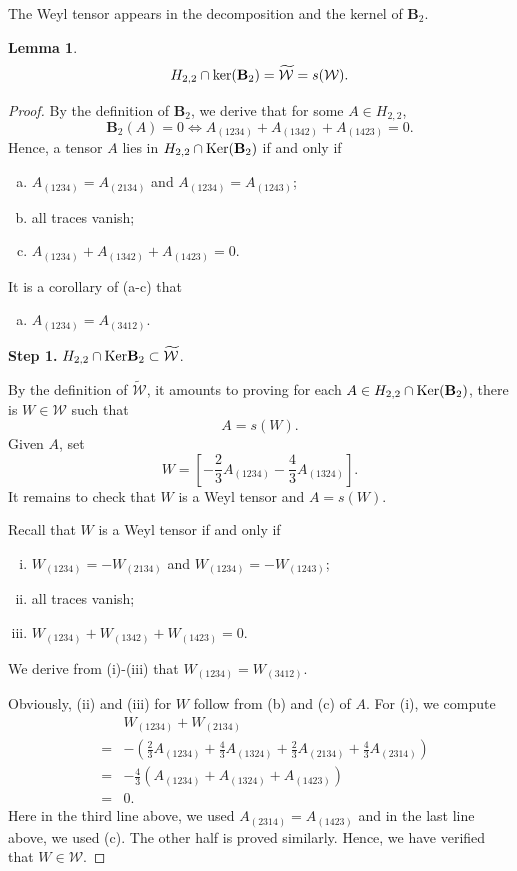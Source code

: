 \documentclass{amsart}
\newtheorem{lem}[thm]{Lemma}
\numberwithin{equation}{section}
\begin{document}
The Weyl tensor appears in the decomposition and the kernel of ${\mathbf B}_2$.
\begin{lem}
	\label{lem:weyl} 
	\[
		H_{2,2}\cap {\rm ker}({\mathbf B}_2) = \widetilde{\mathcal W}=s(\mathcal W).
	\]
\end{lem}
\begin{proof}
	By the definition of ${\mathbf B}_2$, we derive that for some $A\in H_{2,2}$, 
	\[
		{\mathbf B}_2(A)=0 \Longleftrightarrow A_{(1234)} +A_{(1342)}+A_{(1423)}=0.
	\]
	Hence, a tensor $A$ lies in $H_{2,2}\cap {\rm Ker}({\mathbf B}_2)$ if and only if
	\begin{enumerate}[(a)]
		\item $A_{(1234)}=A_{(2134)}$ and $A_{(1234)}=A_{(1243)}$;
		\item all traces vanish;
		\item $A_{(1234)} +A_{(1342)}+A_{(1423)}=0$.
	\end{enumerate}
	It is a corollary of (a-c) that 
	\begin{enumerate}[(d)]
		\item 	$A_{(1234)}=A_{(3412)}$.
	\end{enumerate}

	{\bf Step 1.} $H_{2,2}\cap {\rm Ker}{\mathbf B}_2\subset \widetilde{\mathcal W}$.

	By the definition of $\widetilde{\mathcal W}$, it amounts to proving for each $A\in H_{2,2}\cap {\rm Ker}({\bf B}_2)$, there is $W\in \mathcal W$ such that
	$$
	A= s(W).
	$$
	Given $A$, set
	$$
	W= [-\frac{2}{3}A_{(1234)}-\frac{4}{3}A_{(1324)}].
	$$
	It remains to check that $W$ is a Weyl tensor and $A=s(W)$.

	Recall that $W$ is a Weyl tensor if and only if 
	\begin{enumerate}[(i)]
		\item $W_{(1234)}=-W_{(2134)}$ and $W_{(1234)}=-W_{(1243)}$;
		\item all traces vanish;
		\item $W_{(1234)}+ W_{(1342)}+W_{(1423)}=0$.
	\end{enumerate}
	We derive from (i)-(iii) that $W_{(1234)}=W_{(3412)}$.


	Obviously, (ii) and (iii) for $W$ follow from (b) and (c) of $A$. For (i), we compute
	\begin{eqnarray*}
		&& W_{(1234)}+W_{(2134)}\\
		&=& -\left( \frac{2}{3}A_{(1234)}+\frac{4}{3}A_{(1324)}+ \frac{2}{3}A_{(2134)}+\frac{4}{3}A_{(2314)}\right) \\
		&=& - \frac{4}{3} \left( A_{(1234)} + A_{(1324)}+A_{(1423)}\right) \\
		&=&0.
	\end{eqnarray*}
	Here in the third line above, we used $A_{(2314)}=A_{(1423)}$ and in the last line above, we used (c). The other half is proved similarly. Hence, we have verified that $W\in \mathcal W$.



\end{proof}
\end{document}
